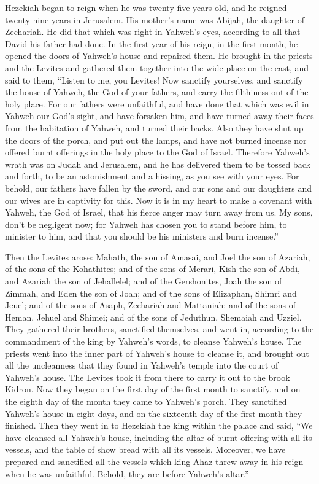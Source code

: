  Hezekiah began to reign when he was twenty-five years old,
and he reigned twenty-nine years in Jerusalem. His mother's name was
Abijah, the daughter of Zechariah.  He did that which was
right in Yahweh's eyes, according to all that David his father had done.
 In the first year of his reign, in the first month, he
opened the doors of Yahweh's house and repaired them.  He
brought in the priests and the Levites and gathered them together into
the wide place on the east,  and said to them, ``Listen to
me, you Levites! Now sanctify yourselves, and sanctify the house of
Yahweh, the God of your fathers, and carry the filthiness out of the
holy place.  For our fathers were unfaithful, and have done
that which was evil in Yahweh our God's sight, and have forsaken him,
and have turned away their faces from the habitation of Yahweh, and
turned their backs.  Also they have shut up the doors of the
porch, and put out the lamps, and have not burned incense nor offered
burnt offerings in the holy place to the God of Israel. 
Therefore Yahweh's wrath was on Judah and Jerusalem, and he has
delivered them to be tossed back and forth, to be an astonishment and a
hissing, as you see with your eyes.  For behold, our fathers
have fallen by the sword, and our sons and our daughters and our wives
are in captivity for this.  Now it is in my heart to make a
covenant with Yahweh, the God of Israel, that his fierce anger may turn
away from us.  My sons, don't be negligent now; for Yahweh
has chosen you to stand before him, to minister to him, and that you
should be his ministers and burn incense.''

 Then the Levites arose: Mahath, the son of Amasai, and
Joel the son of Azariah, of the sons of the Kohathites; and of the sons
of Merari, Kish the son of Abdi, and Azariah the son of Jehallelel; and
of the Gershonites, Joah the son of Zimmah, and Eden the son of Joah;
 and of the sons of Elizaphan, Shimri and Jeuel; and of the
sons of Asaph, Zechariah and Mattaniah;  and of the sons of
Heman, Jehuel and Shimei; and of the sons of Jeduthun, Shemaiah and
Uzziel.  They gathered their brothers, sanctified
themselves, and went in, according to the commandment of the king by
Yahweh's words, to cleanse Yahweh's house.  The priests
went into the inner part of Yahweh's house to cleanse it, and brought
out all the uncleanness that they found in Yahweh's temple into the
court of Yahweh's house. The Levites took it from there to carry it out
to the brook Kidron.  Now they began on the first day of
the first month to sanctify, and on the eighth day of the month they
came to Yahweh's porch. They sanctified Yahweh's house in eight days,
and on the sixteenth day of the first month they finished. 
Then they went in to Hezekiah the king within the palace and said, ``We
have cleansed all Yahweh's house, including the altar of burnt offering
with all its vessels, and the table of show bread with all its vessels.
 Moreover, we have prepared and sanctified all the vessels
which king Ahaz threw away in his reign when he was unfaithful. Behold,
they are before Yahweh's altar.''

